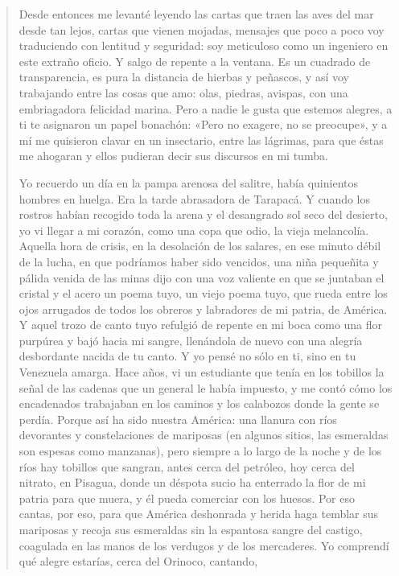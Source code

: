 \documentclass[12pt]{article}
\begin{document}
\begin{verse}
Desde entonces me levanté leyendo las cartas  
que traen las aves del mar desde tan lejos,  
cartas que vienen mojadas, mensajes que poco a poco  
voy traduciendo con lentitud y seguridad: soy meticuloso  
como un ingeniero en este extraño oficio.  
Y salgo de repente a la ventana. Es un cuadrado  
de transparencia, es pura la distancia  
de hierbas y peñascos, y así voy trabajando  
entre las cosas que amo: olas, piedras, avispas,  
con una embriagadora felicidad marina.  
Pero a nadie le gusta que estemos alegres, a ti te asignaron  
un papel bonachón: «Pero no exagere, no se preocupe»,  
y a mí me quisieron clavar en un insectario, entre las lágrimas,  
para que éstas me ahogaran y ellos pudieran decir sus discursos en mi tumba.  
	
Yo recuerdo un día en la pampa arenosa  
del salitre, había quinientos hombres  
en huelga. Era la tarde abrasadora  
de Tarapacá. Y cuando los rostros habían recogido  
toda la arena y el desangrado sol seco del desierto,  
yo vi llegar a mi corazón, como una copa que odio,  
la vieja melancolía. Aquella hora de crisis,  
en la desolación de los salares, en ese minuto débil de  
la lucha, en que podríamos haber sido vencidos,  
una niña pequeñita y pálida venida de las minas  
dijo con una voz valiente en que se juntaban el cristal y el acero  
un poema tuyo, un viejo poema tuyo, que rueda entre los ojos arrugados  
de todos los obreros y labradores de mi patria, de América.  
Y aquel trozo de canto tuyo refulgió de repente  
en mi boca como una flor purpúrea  
y bajó hacia mi sangre, llenándola de nuevo  
con una alegría desbordante nacida de tu canto.  
Y yo pensé no sólo en ti, sino en tu Venezuela amarga.  
Hace años, vi un estudiante que tenía en los tobillos  
la señal de las cadenas que un general le había impuesto,  
y me contó cómo los encadenados trabajaban en los caminos  
y los calabozos donde la gente se perdía. Porque así ha sido nuestra América:  
una llanura con ríos devorantes y constelaciones  
de mariposas (en algunos sitios, las esmeraldas son espesas como manzanas),  
pero siempre a lo largo de la noche y de los ríos  
hay tobillos que sangran, antes cerca del petróleo,  
hoy cerca del nitrato, en Pisagua, donde un déspota sucio  
ha enterrado la flor de mi patria para que muera, y él pueda comerciar con los huesos.  
Por eso cantas, por eso, para que América deshonrada y herida  
haga temblar sus mariposas y recoja sus esmeraldas  
sin la espantosa sangre del castigo, coagulada  
en las manos de los verdugos y de los mercaderes.  
Yo comprendí qué alegre estarías, cerca del Orinoco, cantando,  

\end{verse}
\end{document}
